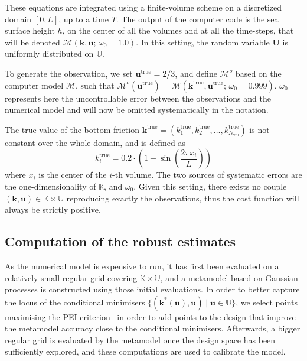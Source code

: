 \documentclass[preprint, 1p]{elsarticle}
\newcommand{\Kspace}{\mathbb{K}}
\newcommand{\Uspace}{\mathbb{U}}
\begin{document}
These equations are integrated using a finite-volume scheme on a discretized domain $[0, L]$, up to a time $T$. The output of the computer code is the sea surface height $h$, on the center of all the volumes and at all the time-steps, that will be denoted $\mathcal{M}(\mathbf{k},\mathbf{u};\, \omega_0=1.0)$.
In this setting, the random variable $\mathbf{U}$ is uniformly distributed on $\Uspace$.

To generate the observation, we set $\mathbf{u}^{\mathrm{true}}=2/3$, and define $\mathcal{M}^o$ based on the computer model $\mathcal{M}$, such that $\mathcal{M}^o(\mathbf{u}^{\mathrm{true}}) = \mathcal{M}(\mathbf{k}^{\mathrm{true}}, \mathbf{u}^{\mathrm{true}}; \, \omega_0 = 0.999)$. $\omega_0$  
represents here the uncontrollable error between the observations and the numerical model and will now be omitted systematically in the notation.

The true value of the bottom friction $\mathbf{k}^{\mathrm{true}} = (k_1^{\mathrm{true}}, k_2^{\mathrm{true}},\dots, k_{N_\mathrm{vol}}^{\mathrm{true}})$ is not constant over the whole domain, and is defined as
\begin{equation*}
{k}^{\mathrm{true}}_i = 0.2\cdot \left(1 + \sin\left(\frac{2 \pi x_i}{L}\right)\right)
\end{equation*}
where $x_i$ is the center of the $i$-th volume. The two sources of systematic errors are the one-dimensionality of $\Kspace$, and $\omega_0$.
Given this setting, there exists no couple $(\mathbf{k},\mathbf{u})\in\Kspace \times \Uspace$ reproducing exactly the observations, thus the cost function will always be strictly positive.

\subsection{Computation of the robust estimates}
As the numerical model is expensive to run, it has first been evaluated on a relatively small regular grid covering $\Kspace \times \Uspace$, and a metamodel based on Gaussian processes is constructed using those initial evaluations. In order to better capture the locus of the conditional minimisers $\{(\mathbf{k}^*(\mathbf{u}), \mathbf{u}) \mid \mathbf{u} \in \Uspace \}$, we select points maximising the PEI criterion~\citep{ginsbourger_bayesian_2014,bossek_learning_2015} in order to add points to the design that improve the metamodel accuracy close to the conditional minimisers.
Afterwards, a bigger regular grid is evaluated by the metamodel once the design space has been sufficiently explored, and these computations are used to calibrate the model.
\end{document}
